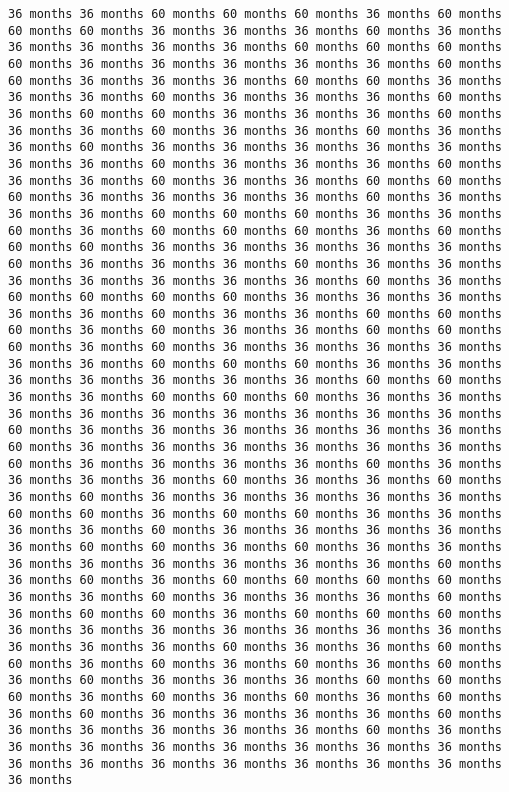 \documentclass[11pt]{article}
\begin{document}
\begin{Verbatim}[commandchars=\\\{\}, frame=single, framerule=2mm, rulecolor=\color{outerrorbackground}]
36 months 36 months 60 months 60 months 60 months 36 months 60 months 60 months 60 months 36 months 36 months 36 months 60 months 36 months 36 months 36 months 36 months 36 months 60 months 60 months 60 months 60 months 36 months 36 months 36 months 36 months 36 months 60 months 60 months 36 months 36 months 36 months 60 months 60 months 36 months 36 months 36 months 60 months 36 months 36 months 36 months 60 months 36 months 60 months 60 months 36 months 36 months 36 months 60 months 36 months 36 months 60 months 36 months 36 months 60 months 36 months 36 months 60 months 36 months 36 months 36 months 36 months 36 months 36 months 36 months 60 months 36 months 36 months 36 months 60 months 36 months 36 months 60 months 36 months 36 months 60 months 60 months 60 months 36 months 36 months 36 months 36 months 60 months 36 months 36 months 36 months 60 months 60 months 60 months 36 months 36 months 60 months 36 months 60 months 60 months 60 months 36 months 60 months 60 months 60 months 36 months 36 months 36 months 36 months 36 months 60 months 36 months 36 months 36 months 60 months 36 months 36 months 36 months 36 months 36 months 36 months 36 months 60 months 36 months 60 months 60 months 60 months 60 months 36 months 36 months 36 months 36 months 36 months 60 months 36 months 36 months 60 months 60 months 60 months 36 months 60 months 36 months 36 months 60 months 60 months 60 months 36 months 60 months 36 months 36 months 36 months 36 months 36 months 36 months 60 months 60 months 60 months 36 months 36 months 36 months 36 months 36 months 36 months 36 months 60 months 60 months 36 months 36 months 60 months 60 months 60 months 36 months 36 months 36 months 36 months 36 months 36 months 36 months 36 months 36 months 60 months 36 months 36 months 36 months 36 months 36 months 36 months 60 months 36 months 36 months 36 months 36 months 36 months 36 months 60 months 36 months 36 months 36 months 36 months 60 months 36 months 36 months 36 months 36 months 60 months 36 months 36 months 60 months 36 months 60 months 36 months 36 months 36 months 36 months 36 months 60 months 60 months 36 months 60 months 60 months 36 months 36 months 36 months 36 months 60 months 36 months 36 months 36 months 36 months 36 months 60 months 60 months 36 months 60 months 36 months 36 months 36 months 36 months 36 months 36 months 36 months 36 months 60 months 36 months 60 months 36 months 60 months 60 months 60 months 60 months 36 months 36 months 60 months 36 months 36 months 36 months 60 months 36 months 60 months 60 months 36 months 60 months 60 months 60 months 36 months 36 months 36 months 36 months 36 months 36 months 36 months 36 months 36 months 36 months 60 months 36 months 36 months 60 months 60 months 36 months 60 months 36 months 60 months 36 months 60 months 36 months 60 months 36 months 36 months 36 months 60 months 60 months 60 months 36 months 60 months 36 months 60 months 36 months 60 months 36 months 60 months 36 months 36 months 36 months 36 months 60 months 36 months 36 months 36 months 36 months 36 months 60 months 36 months 36 months 36 months 36 months 36 months 36 months 36 months 36 months 36 months 36 months 36 months 36 months 36 months 36 months 36 months 36 months 
\end{Verbatim}
\end{document}
